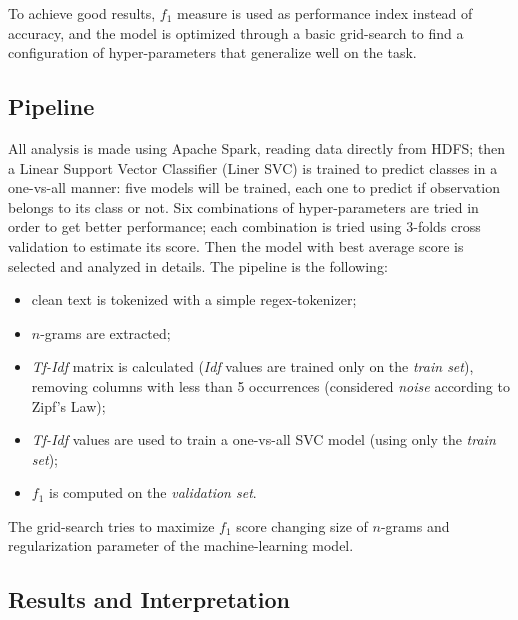 \documentclass[fleqn,10pt]{SelfArx}
\begin{document}
To achieve good results, $f_1$ measure is used as performance index instead of accuracy, and the model is optimized through a basic grid-search to find a configuration of hyper-parameters that generalize well on the task.

\subsection{Pipeline}
All analysis is made using Apache Spark, reading data directly from HDFS; then a Linear Support Vector Classifier (Liner SVC) is trained to predict classes in a one-vs-all manner: five models will be trained, each one to predict if observation belongs to its class or not.
Six combinations of hyper-parameters are tried in order to get better performance; each combination is tried using 3-folds cross validation to estimate its score.
Then the model with best average score is selected and analyzed in details.
The pipeline is the following:
\begin{itemize}[noitemsep]
\item clean text is tokenized with a simple regex-tokenizer;
\item $n$-grams are extracted;
\item \textit{Tf-Idf} matrix is calculated (\textit{Idf} values are trained only on the \textit{train set}), removing columns with less than 5 occurrences (considered \textit{noise} according to Zipf's Law);
\item \textit{Tf-Idf} values are used to train a one-vs-all SVC model (using only the \textit{train set});
\item $f_1$ is computed on the \textit{validation set}.
\end{itemize}
The grid-search tries to maximize $f_1$ score changing size of $n$-grams and regularization parameter of the machine-learning model.

\subsection{Results and Interpretation}
\end{document}
